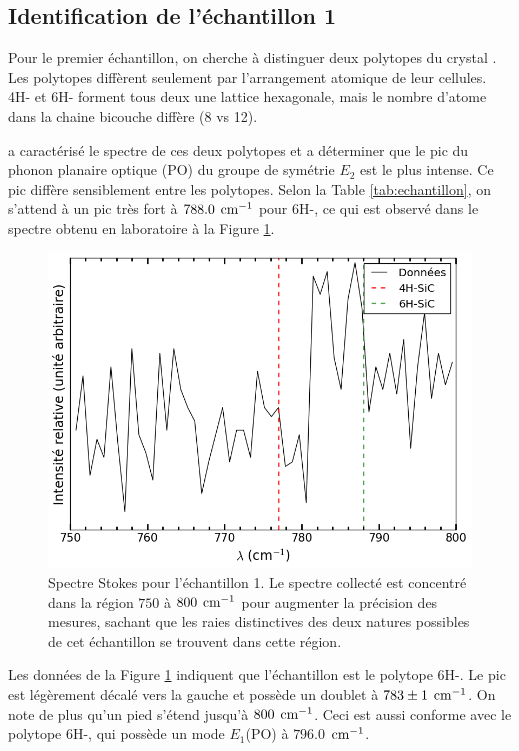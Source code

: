 \documentclass[10pt,letterpaper,twocolumn]{article}
\newcommand{\unit}[1]{\hspace{0.15cm}\text{#1}}
\begin{document}
\subsection{Identification de l'échantillon 1}
Pour le premier échantillon, on cherche à distinguer deux polytopes du crystal . Les polytopes diffèrent seulement par l'arrangement atomique de leur cellules. 4H- et 6H- forment tous deux une lattice hexagonale, mais le nombre d'atome dans la chaine bicouche diffère (8 vs 12)\supercite{Feldman1968_4H}. \par \citeauthor{Burton1998}\supercite{Burton1998} a caractérisé le spectre de ces deux polytopes et a déterminer que le pic du phonon planaire optique (PO) du groupe de symétrie $E_2$ est le plus intense. Ce pic diffère sensiblement entre les polytopes. Selon la Table \ref{tab:echantillon}, on s'attend à un pic très fort à $788.0\unit{cm}^{-1}$ pour 6H-, ce qui est observé dans le spectre obtenu en laboratoire à la Figure \ref{fig:e1}.
\begin{figure}[H]
	\centering
	\includegraphics[width=0.8\linewidth]{figures/echantillon1.png}
	\caption{Spectre Stokes pour l'échantillon 1. Le spectre collecté est concentré dans la région $750$ à $800\unit{cm}^{-1}$ pour augmenter la précision des mesures, sachant que les raies distinctives des deux natures possibles de cet échantillon se trouvent dans cette région.}
	\label{fig:e1}
\end{figure}
Les données de la Figure \ref{fig:e1} indiquent que l'échantillon est le polytope 6H-. Le pic est légèrement décalé vers la gauche et possède un doublet à $783 \pm 1\unit{cm}^{-1}$. On note de plus qu'un pied s'étend jusqu'à $800\unit{cm}^{-1}$. Ceci est aussi conforme avec le polytope 6H-, qui possède un mode $E_1$(PO) à $796.0$\supercite{Burton1998}$\unit{cm}^{-1}$. 
\end{document}
